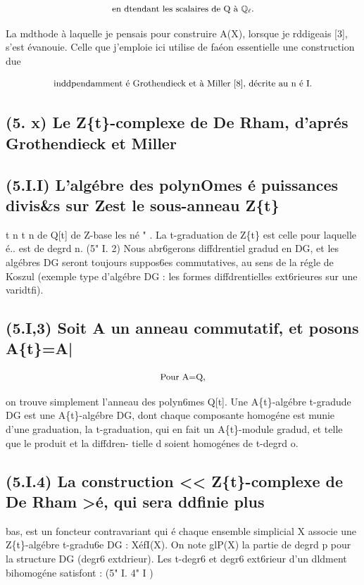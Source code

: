 \documentclass[11pt]{article}
\theoremstyle{remark}
\begin{document}
\[\text{\small en dtendant les scalaires de Q à \(\mathbb{Q}_{\ell}\).}\]

La mdthode à laquelle je pensais pour construire A(X), lorsque je rddigeais [3], s'est évanouie. Celle que j'emploie ici utilise de faéon essentielle une construction due

\[\text{\small inddpendamment é Grothendieck et à Miller [8], décrite au n é I.}\]

\subsection*{(5. x) Le Z\{t\}-complexe de De Rham, d'aprés Grothendieck et Miller}

\subsection*{(5.I.I) L'algébre des polynOmes é puissances divis\&s sur Zest le sous-anneau Z\{t\}}

t n t n de Q[t] de Z-base les né " . La t-graduation de Z\{t\} est celle pour laquelle é.. est de degrd n. (5" I. 2) Nous abr6gerons diffdrentiel gradud en DG, et les algébres DG seront toujours suppos6es commutatives, au sens de la régle de Koszul (exemple type d'algébre DG : les formes diffdrentielles ext6rieures sur une varidtfi).

\subsection*{(5.I,3) Soit A un anneau commutatif, et posons A\{t\}=A|}

\[\text{\small Pour A=Q,}\]

on trouve simplement l'anneau des polyn6mes Q[t]. Une A\{t\}-algébre t-gradude DG est une A\{t\}-algébre DG, dont chaque composante homogéne est munie d'une graduation, la t-graduation, qui en fait un A\{t\}-module gradud, et telle que le produit et la diffdren- tielle d soient homogénes de t-degrd o.

\subsection*{(5.I.4) La construction << Z\{t\}-complexe de De Rham >é, qui sera ddfinie plus}

bas, est un foncteur contravariant qui é chaque ensemble simplicial X associe une Z\{t\}-algébre t-gradu6e DG : XéfI(X). On note glP(X) la partie de degrd p pour la structure DG (degr6 extdrieur). Les t-degr6 et degr6 ext6rieur d'un dldment bihomogéne satisfont : (5" I. 4" I )
\end{document}
